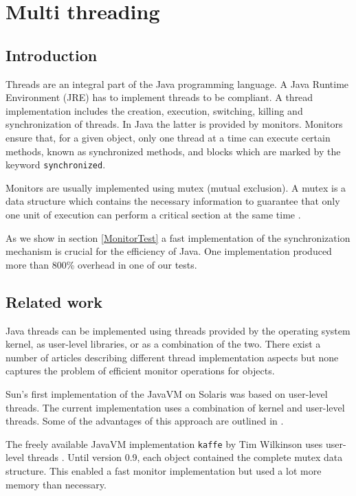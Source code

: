 \section{Multi threading}

\subsection{Introduction}

Threads are an integral part of the Java programming language. A Java
Runtime Environment (JRE) has to implement threads to be compliant. A
thread implementation includes the creation, execution, switching,
killing and synchronization of threads. In Java the latter is provided
by monitors. Monitors ensure that, for a given object, only one thread
at a time can execute certain methods, known as synchronized methods,
and blocks which are marked by the keyword \texttt{synchronized}.

Monitors are usually implemented using mutex (mutual exclusion). A
mutex is a data structure which contains the necessary information to
guarantee that only one unit of execution can perform a critical
section at the same time \cite{Stallings95}.

As we show in section \ref{MonitorTest} a fast implementation of the
synchronization mechanism is crucial for the efficiency of Java. One
implementation produced more than 800\% overhead in one of our tests.


\subsection{Related work}

Java threads can be implemented using threads provided by the
operating system kernel, as user-level libraries, or as a combination
of the two. There exist a number of articles describing different
thread implementation aspects but none captures the problem of
efficient monitor operations for objects.

Sun's first implementation of the JavaVM on Solaris was based on
user-level threads. The current implementation uses a combination of
kernel and user-level threads. Some of the advantages of this approach
are outlined in \cite{SunThreads97}.

The freely available JavaVM implementation {\tt kaffe} by Tim
Wilkinson uses user-level threads \cite{Wilkinson:97}. Until version
0.9, each object contained the complete mutex data structure. This
enabled a fast monitor implementation but used a lot more memory than
necessary.

